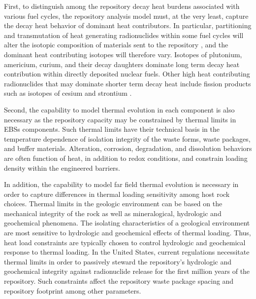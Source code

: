 First, to distinguish among the repository decay heat burdens associated with 
various fuel cycles, the repository analysis model must, at the very least, 
capture the decay heat behavior of dominant heat contributors. In particular, 
partitioning and transmutation of heat generating radionuclides within  some 
fuel cycles will alter the isotopic composition of materials sent to the 
repository \cite{swift_applying_2010}, and the dominant heat contributing 
isotopes will therefore vary.  Isotopes of plutonium, americium, curium, and their 
decay daughters dominate long term decay heat contribution within directly 
deposited nuclear fuels.  Other high heat contributing radionuclides that may 
dominate shorter term decay heat include fission products such as isotopes of 
cesium and strontium \cite{piet_which_2007}. 

Second, the capability to model thermal evolution in each component is also 
necessary as the repository capacity may be constrained by thermal limits in 
\glspl{EBS} components. Such thermal limits have their technical basis in the 
temperature dependence of isolation integrity of the waste forms, waste 
packages, and buffer materials. Alteration, corrosion, degradation, and 
dissolution behaviors are often function of heat, in addition to redox 
conditions, and constrain loading density within the engineered barriers. 

In addition, the capability to model far field thermal evolution is necessary in 
order to capture differences in thermal loading sensitivity among host rock 
choices. Thermal limits in the geologic environment can be based on the mechanical 
integrity of the rock as well as mineralogical, hydrologic and geochemical 
phenomena. The isolating characteristics of a geological environment are most 
sensitive to hydrologic 
and geochemical effects of thermal loading. Thus, heat load constraints are 
typically chosen to control hydrologic and geochemical response to thermal 
loading. In the United States, current regulations necessitate thermal limits in 
order to passively steward the repository's hydrologic and geochemical integrity 
against radionuclide  release for the first million years of the repository. 
Such constraints affect the repository waste package spacing and repository footprint among 
other parameters. 

